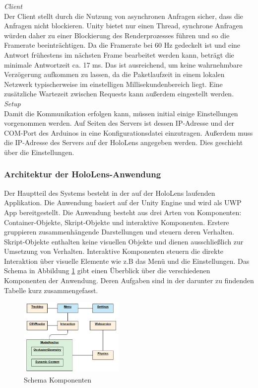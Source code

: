 \textit{Client}\\
Der Client stellt durch die Nutzung von asynchronen Anfragen sicher, dass die Anfragen nicht blockieren. Unity bietet nur einen Thread, synchrone Anfragen würden daher zu einer Blockierung des Renderprozesses führen und so die Framerate beeinträchtigen. Da die Framerate bei 60 Hz gedeckelt ist und eine Antwort frühestens im nächsten Frame bearbeitet werden kann, beträgt die minimale Antwortzeit ca. 17 ms. Das ist ausreichend, um keine wahrnehmbare Verzögerung aufkommen zu lassen, da die Paketlaufzeit in einem lokalen Netzwerk typischerweise im einstelligen Millisekundenbereich liegt. Eine zusätzliche Wartezeit zwischen Requests kann außerdem eingestellt werden.\\

\textit{Setup}\\
Damit die Kommunikation erfolgen kann, müssen initial einige Einstellungen vorgenommen werden. Auf Seiten des Servers ist dessen IP-Adresse und der COM-Port des Arduinos in eine Konfigurationsdatei einzutragen. Außerdem muss die IP-Adresse des Servers auf der HoloLens angegeben werden. Dies geschieht über die Einstellungen.

\subsubsection{Architektur der HoloLens-Anwendung}
\label{sec-5-1-2}
Der Hauptteil des Systems besteht in der auf der HoloLens laufenden Applikation. Die Anwendung basiert auf der Unity Engine und wird als UWP App bereitgestellt. Die Anwendung besteht aus drei Arten von Komponenten: Container-Objekte, Skript-Objekte und interaktive Komponenten. Erstere gruppieren zusammenhängende Darstellungen und steuern deren Verhalten. Skript-Objekte enthalten keine visuellen Objekte und dienen ausschließlich zur Umsetzung von Verhalten. Interaktive Komponenten steuern die direkte Interaktion über visuelle Elemente wie z.B das Menü und die Einstellungen. Das Schema in Abbildung \ref{img:components-schema} gibt einen Überblick über die verschiedenen Komponenten der Anwendung. Deren Aufgaben sind in der darunter zu findenden Tabelle kurz zusammengefasst.

\begin{figure}[H]
	\centering
	\includegraphics[width=0.45\textwidth]{images/schema/components.jpg}
	\caption{Schema Komponenten}
	\label{img:components-schema}
\end{figure}


